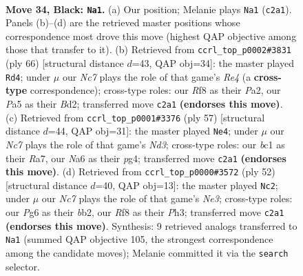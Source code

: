 \documentclass[11pt]{article}
\begin{document}
\clearpage

\begin{figure}[p]\centering
\begin{subfigure}{0.46\textwidth}\centering
\resizebox{\linewidth}{!}{%
\newchessgame
\chessboard[
  setfen={5r2/1ppkp2p/n5p1/pN6/5P1P/2P5/P1n2PK1/2B4R b - - 14 34},
  showmover=false,
  pgfstyle=straightmove, color=movearrow, markmove={c2-a1}
]}
\caption{}
\end{subfigure}\hfill
\begin{subfigure}{0.46\textwidth}\centering
\resizebox{\linewidth}{!}{%
\newchessgame
\chessboard[
  setfen={5k2/p1b2pp1/3r2p1/1p1nN3/4R2P/6P1/PP1B1P2/5K2 w - - 8 34},
  showmover=false,
  pgfstyle=straightmove, color=movearrow, markmove={e4-d4}
]}
\caption{}
\end{subfigure}
\\[4pt]
\begin{subfigure}{0.46\textwidth}\centering
\resizebox{\linewidth}{!}{%
\newchessgame
\chessboard[
  setfen={8/r1p2kpp/3npp2/8/3N1PP1/1PR5/4P2P/6K1 b - - 0 29},
  showmover=false,
  pgfstyle=straightmove, color=movearrow, markmove={d6-e4}
]}
\caption{}
\end{subfigure}\hfill
\begin{subfigure}{0.46\textwidth}\centering
\resizebox{\linewidth}{!}{%
\newchessgame
\chessboard[
  setfen={1r4k1/5pp1/Rp2p3/7p/2P1P3/1P2N2P/1b3P2/6K1 w - - 2 27},
  showmover=false,
  pgfstyle=straightmove, color=movearrow, markmove={e3-c2}
]}
\caption{}
\end{subfigure}
\caption{\textbf{Move 34, Black: \texttt{Na1}.} (a) Our position; Melanie plays \texttt{Na1} (\texttt{c2a1}). Panels (b)--(d) are the retrieved master positions whose correspondence most drove this move (highest QAP objective among those that transfer to it). (b) Retrieved from \texttt{ccrl\_top\_p0002\#3831} (ply 66) [structural distance $d$=43, QAP obj=34]: the master played \texttt{Rd4}; under $\mu$ our \emph{Nc7} plays the role of that game's \emph{Re4} (a \textbf{cross-type} correspondence); cross-type roles: our \emph{R}f8 as their \emph{P}a2, our \emph{P}a5 as their \emph{B}d2; transferred move \texttt{c2a1} \textbf{(endorses this move)}. (c) Retrieved from \texttt{ccrl\_top\_p0001\#3376} (ply 57) [structural distance $d$=44, QAP obj=31]: the master played \texttt{Ne4}; under $\mu$ our \emph{Nc7} plays the role of that game's \emph{Nd3}; cross-type roles: our \emph{b}c1 as their \emph{R}a7, our \emph{N}a6 as their \emph{p}g4; transferred move \texttt{c2a1} \textbf{(endorses this move)}. (d) Retrieved from \texttt{ccrl\_top\_p0000\#3572} (ply 52) [structural distance $d$=40, QAP obj=13]: the master played \texttt{Nc2}; under $\mu$ our \emph{Nc7} plays the role of that game's \emph{Ne3}; cross-type roles: our \emph{P}g6 as their \emph{b}b2, our \emph{R}f8 as their \emph{P}h3; transferred move \texttt{c2a1} \textbf{(endorses this move)}. Synthesis: 9 retrieved analogs transferred to \texttt{Na1} (summed QAP objective 105, the strongest correspondence among the candidate moves); Melanie committed it via the \texttt{search} selector.}
\label{fig:thought-m67}
\end{figure}
\end{document}
